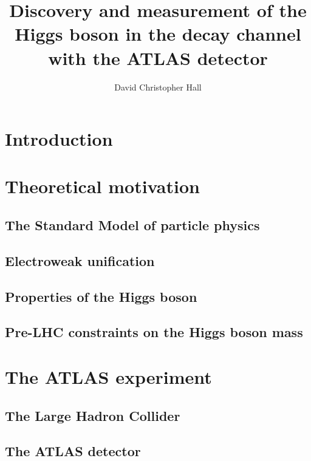 \documentclass[hyper,linkcolor=blue]{mythesis}
\title{Discovery and measurement of the Higgs boson in the \WW decay channel with the ATLAS detector}
\author{David Christopher Hall}
\begin{document}
\begin{frontmatter}
  
\end{frontmatter}

\begin{mainmatter}
  \listoftodos
  
  
  \chapter*{Introduction}
    \label{chap:intro}
    

  \chapter{Theoretical motivation}
    \label{chap:motivation}
    
    \section{The Standard Model of particle physics}
      \label{sec:sm}
      
    \section{Electroweak unification}
      \label{sec:ewsb}
      
    \section{Properties of the Higgs boson}
      \label{sec:properties}
      
    \section{Pre-LHC constraints on the Higgs boson mass}
      \label{sec:prior_constraints}
      

  \chapter{The ATLAS experiment}
    \label{chap:experiment}
    
    \section{The Large Hadron Collider}
      \label{sec:lhc}
      
    \section{The ATLAS detector}
      \label{sec:atlas}
      

\end{mainmatter}
\end{document}
